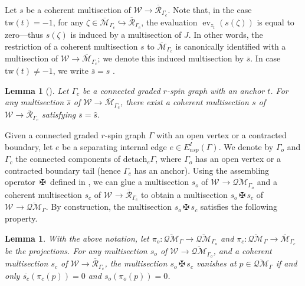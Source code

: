 \documentclass[11pt]{amsart}
\newtheorem{lem}[dummy]{Lemma}
\theoremstyle{definition}
\theoremstyle{remark}
\newcommand{\tw}{\text{tw}}
\newcommand{\Ass}{{{\,\maltese\,}}}
\newcommand{\oQMb}{{\overline{\mathcal{QM}}}}
\newcommand{\<}{\left<}
\renewcommand{\>}{\right>}
\numberwithin{equation}{section}
\def\Mbar{{\overline{\mathcal M}}}
\begin{document}
Let $s$ be a coherent multisection of $\mathcal{W} \rightarrow {\overline{\mathcal{R}}}_{\Gamma_c}$. Note that, in the case $\tw(t)=-1$, for any $\zeta\in\Mbar_{\Gamma_c} \hookrightarrow {\overline{\mathcal{R}}}_{\Gamma_c}$, the evaluation $\operatorname{ev}_{z_t}(s(\zeta))$ is equal %
to zero---thus $s(\zeta)$ %
is induced by a multisection of $J$.  In other words, the restriction of a coherent multisection $s$ to $\Mbar_{\Gamma_c}$ is canonically identified with a multisection of ${\mathcal{W}} \rightarrow \Mbar_{\Gamma_c}$; we denote this induced multisection by $\overline{s}$.  In case $\tw(t)\ne -1$, we write $\overline{s} = s$%
.
\begin{lem}[{\cite[Lem. 2.12]{TZ2}}]
    Let %
$\Gamma_c$ be a connected graded $r$-spin graph with an anchor %
$t$. For any %
multisection $\hat s$ of $\mathcal W\to \Mbar_{\Gamma_c}$,
    there exist a coherent multisection $s$ of $\mathcal W\to {\overline{\mathcal{R}}}_{\Gamma_c}$ satisfying $\overline{s}=\hat s$.
\end{lem}






Given a connected graded $r$-spin graph $\Gamma$ with an open vertex or a contracted boundary, let $e$ be a separating internal edge $e\in E_{nsp}^I(\Gamma)$. We denote by $\Gamma_o$ and $\Gamma_c$ the connected components of ${\text{detach} }_e \Gamma$, where $\Gamma_o$ has an open vertex or a contracted boundary tail (hence $\Gamma_c$ has an anchor). Using the assembling operator $\Ass$ defined in \cite[\S 4.1.3]{BCT2}, we can glue a multisection $s_o$ of $\mathcal W^{}\to \oQMb_{\Gamma_o}$ and a coherent multisection $s_c$ of $\mathcal W^{}\to {\overline{\mathcal{R}}}_{\Gamma_c}$ to obtain a multisection $s_o\Ass s_c$ of $\mathcal W^{}\to \oQMb_{\Gamma}$. %
By construction, the %
multisection $s_o\Ass s_c$ satisfies the following property.

\begin{lem} \label{lem zero of assembling}
    With the above notation, let $\pi_o\colon \oQMb_\Gamma \to \oQMb_{\Gamma_o}$ %
and $\pi_c\colon \oQMb_\Gamma \to \Mbar_{\Gamma_c}$ be %
the projections.
    For any multisection $s_o$ of $\mathcal W \to \oQMb_{\Gamma_o}$, and a coherent multisection $s_c$ of $\mathcal W \to \overline{\mathcal R}_{\Gamma_c}$, the multisection $s_o\Ass s_c$ vanishes at $p\in \oQMb_\Gamma$ if and only $\overline{s_c}(\pi_c(p))=0$ and $s_o(\pi_o(p))=0$.
\end{lem}
\end{document}
